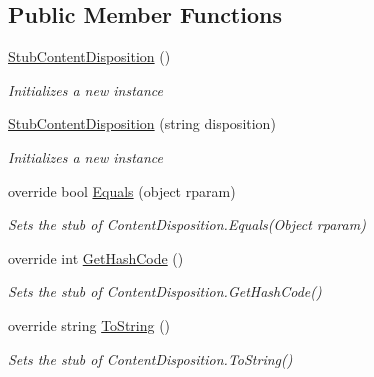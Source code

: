 \subsection*{Public Member Functions}
\begin{DoxyCompactItemize}
\item 
\hyperlink{class_system_1_1_net_1_1_mime_1_1_fakes_1_1_stub_content_disposition_a96867039788a4fea6f9de04e32634310}{Stub\-Content\-Disposition} ()
\begin{DoxyCompactList}\small\item\em Initializes a new instance\end{DoxyCompactList}\item 
\hyperlink{class_system_1_1_net_1_1_mime_1_1_fakes_1_1_stub_content_disposition_a7a8e1266734b7a6c0e8aabc9c9c6a90e}{Stub\-Content\-Disposition} (string disposition)
\begin{DoxyCompactList}\small\item\em Initializes a new instance\end{DoxyCompactList}\item 
override bool \hyperlink{class_system_1_1_net_1_1_mime_1_1_fakes_1_1_stub_content_disposition_a83fd5a019302163f6e489c55753849b5}{Equals} (object rparam)
\begin{DoxyCompactList}\small\item\em Sets the stub of Content\-Disposition.\-Equals(\-Object rparam)\end{DoxyCompactList}\item 
override int \hyperlink{class_system_1_1_net_1_1_mime_1_1_fakes_1_1_stub_content_disposition_a2756a648c46936e5094739fc307000b4}{Get\-Hash\-Code} ()
\begin{DoxyCompactList}\small\item\em Sets the stub of Content\-Disposition.\-Get\-Hash\-Code()\end{DoxyCompactList}\item 
override string \hyperlink{class_system_1_1_net_1_1_mime_1_1_fakes_1_1_stub_content_disposition_a49b175e9d64855e61a5cbe4b2e11c0df}{To\-String} ()
\begin{DoxyCompactList}\small\item\em Sets the stub of Content\-Disposition.\-To\-String()\end{DoxyCompactList}\end{DoxyCompactItemize}
